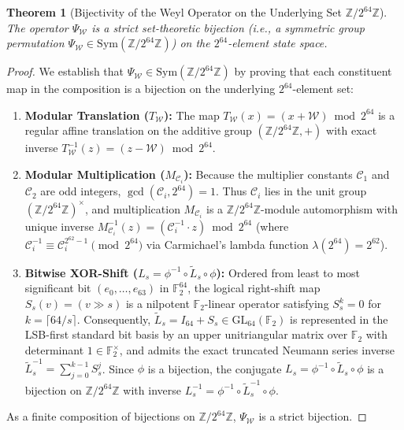 \documentclass[11pt, a4paper]{article}
\newtheorem{theorem}{Theorem}[section]
\begin{document}
\begin{theorem}[Bijectivity of the Weyl Operator on the Underlying Set $\mathbb{Z}/2^{64}\mathbb{Z}$]
\label{thm:weyl_bijection}
The operator $\Psi_{\mathcal{W}}$ is a strict set-theoretic bijection (i.e., a symmetric group permutation $\Psi_{\mathcal{W}} \in \mathrm{Sym}(\mathbb{Z}/2^{64}\mathbb{Z})$) on the $2^{64}$-element state space.
\end{theorem}
\begin{proof}
We establish that $\Psi_{\mathcal{W}} \in \mathrm{Sym}(\mathbb{Z}/2^{64}\mathbb{Z})$ by proving that each constituent map in the composition is a bijection on the underlying $2^{64}$-element set:
\begin{enumerate}
    \item \textbf{Modular Translation ($T_{\mathcal{W}}$):} The map $T_{\mathcal{W}}(x) = (x + \mathcal{W}) \bmod 2^{64}$ is a regular affine translation on the additive group $(\mathbb{Z}/2^{64}\mathbb{Z}, +)$ with exact inverse $T_{\mathcal{W}}^{-1}(z) = (z - \mathcal{W}) \bmod 2^{64}$.
    \item \textbf{Modular Multiplication ($M_{\mathcal{C}_i}$):} Because the multiplier constants $\mathcal{C}_1$ and $\mathcal{C}_2$ are odd integers, $\gcd(\mathcal{C}_i, 2^{64}) = 1$. Thus $\mathcal{C}_i$ lies in the unit group $(\mathbb{Z}/2^{64}\mathbb{Z})^\times$, and multiplication $M_{\mathcal{C}_i}$ is a $\mathbb{Z}/2^{64}\mathbb{Z}$-module automorphism with unique inverse $M_{\mathcal{C}_i}^{-1}(z) = (\mathcal{C}_i^{-1} \cdot z) \bmod 2^{64}$ (where $\mathcal{C}_i^{-1} \equiv \mathcal{C}_i^{2^{62}-1} \pmod{2^{64}}$ via Carmichael's lambda function $\lambda(2^{64}) = 2^{62}$).
    \item \textbf{Bitwise XOR-Shift ($L_s = \phi^{-1} \circ \widetilde{L}_s \circ \phi$):} Ordered from least to most significant bit $(e_0, \dots, e_{63})$ in $\mathbb{F}_2^{64}$, the logical right-shift map $S_s(v) = (v \gg s)$ is a nilpotent $\mathbb{F}_2$-linear operator satisfying $S_s^k = 0$ for $k = \lceil 64/s \rceil$. Consequently, $\widetilde{L}_s = I_{64} + S_s \in \mathrm{GL}_{64}(\mathbb{F}_2)$ is represented in the LSB-first standard bit basis by an upper unitriangular matrix over $\mathbb{F}_2$ with determinant $1 \in \mathbb{F}_2^\times$, and admits the exact truncated Neumann series inverse $\widetilde{L}_s^{-1} = \sum_{j=0}^{k-1} S_s^j$. Since $\phi$ is a bijection, the conjugate $L_s = \phi^{-1} \circ \widetilde{L}_s \circ \phi$ is a bijection on $\mathbb{Z}/2^{64}\mathbb{Z}$ with inverse $L_s^{-1} = \phi^{-1} \circ \widetilde{L}_s^{-1} \circ \phi$.
\end{enumerate}
As a finite composition of bijections on $\mathbb{Z}/2^{64}\mathbb{Z}$, $\Psi_{\mathcal{W}}$ is a strict bijection.
\end{proof}
\end{document}
